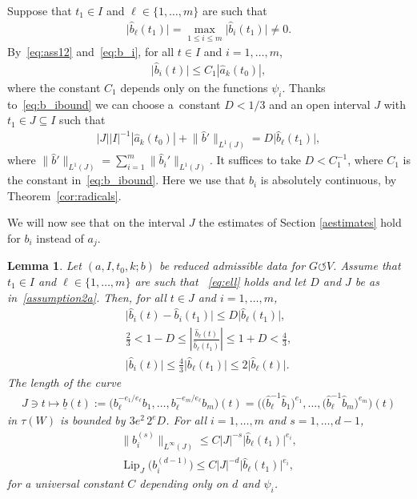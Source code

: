 \documentclass[pdftex]{sigma}
\numberwithin{equation}{section}
\newtheorem{Lemma}[Theorem]{Lemma}
\def\ta{\tau}
\def\ps{\psi}
\def\ul{\underline}
\def\Lip{\on{Lip}}
\def\we{\hat}
\def\acts{\circlearrowleft}
\let\on=\operatorname
\begin{document}
Suppose that $t_1 \in I$ and $\ell \in \{1,\dots,m\}$ are such that
\begin{gather} \label{eq:ell}
\big |\we b_\ell(t_1)\big| = \max_{1 \le i \le m}\big |\we b_i(t_1)\big| \ne 0.
\end{gather}
By~\eqref{eq:ass12} and~\eqref{eq:b_i}, for all $t \in I$ and $i = 1,\dots,m$,
 \begin{gather} \label{eq:b_ibound}
\big|\we b_i(t) \big| \le C_1 |\we a_k (t_0)|,
 \end{gather}
where the constant $C_1$ depends only on the functions $\ps_i$.
Thanks to~\eqref{eq:b_ibound} we can choose
a~con\-stant $D< 1/3$ and an open interval $J$ with $t_1 \in J \subseteq I$ such that
\begin{gather} \label{assumption2a}
 | J| |I|^{-1} {|\we a_k(t_0)|}
 + \big\|\we b '\big\|_{L^1 (J)} = D \big|\we b_\ell(t_1)\big|,
\end{gather}
where $\big\|\we b '\big\|_{L^1 (J)} = \sum_{i=1}^m\big \|\we b_i '\big\|_{L^1 (J)}$.
It suffices to take $D < C_1^{-1}$, where $C_1$ is the constant in~\eqref{eq:b_ibound}.
Here we use that $\we b _i$ is absolutely continuous,
by Theorem~\ref{cor:radicals}.

We will now see that on the interval $J$ the estimates of Section \ref{aestimates} hold for $b_i$
instead of $a_j$.


\begin{Lemma} \label{lemB}
 Let $(a, I, t_0, k; b)$ be reduced admissible data for $G \acts V$.
 Assume that $t_1 \in I$ and $\ell \in \{1,\dots,m\}$ are such that
~\eqref{eq:ell} holds and
 let $D$ and $J$ be as in~\eqref{assumption2a}.
 Then,
 for all $t \in J$ and $i = 1,\dots,m$,
 \begin{gather}
 \big| \we b_i (t) - \we b_i (t_1)\big| \le D \big|\we b_\ell (t_1)\big|, \label{b1}
 \\
 \frac 2 3 < 1-D \le \left | \frac{\we b_\ell(t)}{\we b_\ell(t_1)} \right| \le 1+D < \frac 4 3,
 \label{b2}
 \\
 \big|\we b_i(t)\big|\le \frac 4 3 \big|\we b_\ell(t_1)\big| \le 2 \big|\we b_\ell(t)\big|. \label{b3}
 \end{gather}
 The length of the curve
 \begin{gather*}
 J \ni t \mapsto \ul b(t)
 := \big( b_\ell^{-e_1/e_\ell} b_1, \dots, b_\ell^{-e_m/e_\ell} b_{m}\big)(t)
 = \big( \big(\we b_\ell^{-1} \we b_1\big)^{e_1}, \dots, \big(\we b_\ell^{-1} \we b_m\big)^{e_m}\big)(t)
 \end{gather*}
 in $\ta(W)$ is bounded by $3 e^2\, 2^{e} D$.
 For all $ i = 1,\dots,m$ and $ s = 1,\dots,d-1$,
 \begin{gather}
 \big\| b_i^{(s)} \big\|_{L^\infty(J)} \le C |J|^{-s} \big|\we b_\ell (t_1)\big|^{e_i},\nonumber
 \\
 \Lip_J\big(b_i^{(d-1)}\big) \le C |J|^{-d} \big|\we b_\ell (t_1)\big|^{e_i},\label{b4}
 \end{gather}
 for a universal constant $C$ depending only on $d$ and $\ps_i$.
\end{Lemma}
\end{document}
